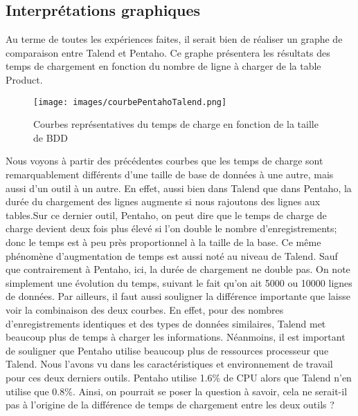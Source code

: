 \documentclass[12pt,a4wide,twoside]{report}
\begin{document}
	\subsection{Interprétations graphiques}
	Au terme de toutes les expériences faites, il serait bien de réaliser un graphe de comparaison entre Talend et Pentaho. Ce graphe présentera les résultats des temps de chargement en fonction du nombre de ligne à charger de la table Product.\newline
	\begin{figure}[!h]
		\begin{center}
			\texttt{[image: images/courbePentahoTalend.png]}
		\end{center}
		\caption{Courbes représentatives du temps de charge en fonction de la taille de BDD}
	\end{figure}
	\newline
	Nous voyons à partir des précédentes courbes que les temps de charge sont remarquablement différents d'une taille de base de données à une autre, mais aussi d'un outil à un autre.\newline
En effet, aussi bien dans Talend que dans Pentaho, la durée du chargement des lignes augmente si nous rajoutons des lignes aux tables.Sur ce dernier outil, Pentaho, on peut dire que le temps de charge de charge devient deux fois plus élevé si l'on double le nombre d'enregistrements; donc le temps est à peu près proportionnel à la taille de la base.\newline
Ce même phénomène d'augmentation de temps est aussi noté au niveau de Talend. Sauf que contrairement à Pentaho, ici, la durée de chargement ne double pas. On note simplement une évolution du temps, suivant le fait qu'on ait 5000 ou 10000 lignes de données.\newline
Par ailleurs, il faut aussi souligner la différence importante que laisse voir la combinaison des deux courbes. En effet, pour des nombres d'enregistrements identiques et des types de données similaires, Talend met beaucoup plus de temps à charger les informations. Néanmoins, il est important de souligner que Pentaho utilise beaucoup plus de ressources processeur que Talend. Nous l'avons vu dans les caractéristiques et environnement de travail pour ces deux derniers outils. Pentaho utilise 1.6\% de CPU alors que Talend n'en utilise que 0.8\%. Ainsi, on pourrait se poser la question à savoir, cela ne serait-il pas à l'origine de la différence de temps de chargement entre les deux outils ?\newline
\end{document}
